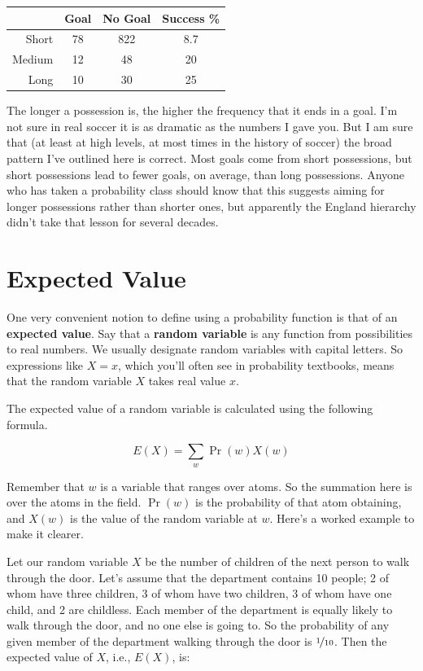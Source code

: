 \documentclass[openany]{book}
\begin{document}
\begin{center}
\begin{tabular}{r | c c | c}
& Goal & No Goal & Success \% \\ \hline
Short & 78 & 822 & 8.7 \\ %
Medium & 12 & 48 &	20 \\ %
Long & 10 & 30 & 25 %
\end{tabular}
\end{center}
The longer a possession is, the higher the frequency that it ends in a goal. I'm not sure in real soccer it is as dramatic as the numbers I gave you. But I am sure that (at least at high levels, at most times in the history of soccer) the broad pattern I've outlined here is correct. Most goals come from short possessions, but short possessions lead to fewer goals, on average, than long possessions. Anyone who has taken a probability class should know that this suggests aiming for longer possessions rather than shorter ones, but apparently the England hierarchy didn't take that lesson for several decades.

\section{Expected Value}
One very convenient notion to define using a probability function is that of an \textbf{expected value}. Say that a \textbf{random variable} is any function from possibilities to real numbers. We usually designate random variables with capital letters. So expressions like $X=x$, which you'll often see in probability textbooks, means that the random variable $X$ takes real value $x$. 

The expected value of a random variable is calculated using the following formula.

\begin{equation*}
E(X) = \sum_w \Pr(w)X(w)
\end{equation*}

\noindent Remember that $w$ is a variable that ranges over atoms. So the summation here is over the atoms in the field. $\Pr(w)$ is the probability of that atom obtaining, and $X(w)$ is the value of the random variable at $w$. Here's a worked example to make it clearer.

Let our random variable $X$ be the number of children of the next person to walk through the door. Let's assume that the department contains 10 people; 2 of whom have three children, 3 of whom have two children, 3 of whom have one child, and 2 are childless. Each member of the department is equally likely to walk through the door, and no one else is going to. So the probability of any given member of the department walking through the door is $\nicefrac{1}{10}$. Then the expected value of $X$, i.e., $E(X)$, is:
\end{document}
